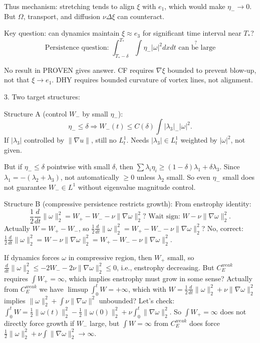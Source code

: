 \documentclass[11pt]{article}
\begin{document}
Thus mechanism: stretching tends to align $\xi$ with $e_1$, which would make $\eta_-\to0$. But $\Omega$, transport, and diffusion $\nu\Delta\xi$ can counteract.

Key question: can dynamics maintain $\xi\approx e_3$ for significant time interval near $T_*$?
\begin{equation*}
\boxed{\text{Persistence question: } \int_{T_*-\delta}^{T_*}\int \eta_-|\omega|^2 dx dt \stackrel{?}{\text{ can be large}}}
\end{equation*}

No result in PROVEN gives answer. CF requires $\nabla\xi$ bounded to prevent blow-up, not that $\xi\to e_1$. DHY requires bounded curvature of vortex lines, not alignment.

3. Two target structures:

Structure A (control $W_-$ by small $\eta_-$):
\begin{equation*}
\boxed{\eta_-\le\delta \Rightarrow W_-(t)\le C(\delta)\int |\lambda_3|_-|\omega|^2}.
\end{equation*}
If $|\lambda_3|$ controlled by $\|\nabla u\|$, still no $L^1_t$. Needs $|\lambda_3|\in L^1_t$ weighted by $|\omega|^2$, not given.

But if $\eta_-\le\delta$ pointwise with small $\delta$, then $\sum\lambda_i\eta_i\ge (1-\delta)\lambda_1+\delta\lambda_3$. Since $\lambda_1=-(\lambda_2+\lambda_3)$, not automatically $\ge0$ unless $\lambda_2$ small. So even $\eta_-$ small does not guarantee $W_-\in L^1$ without eigenvalue magnitude control.

Structure B (compressive persistence restricts growth):
From enstrophy identity:
\begin{equation*}
\frac12\frac{d}{dt}\|\omega\|_2^2 = W_+ - W_- -\nu\|\nabla\omega\|_2^2\text{? Wait sign: }W -\nu\|\nabla\omega\|_2^2.
\end{equation*}
Actually $W=W_+-W_-$, so $\frac12\frac{d}{dt}\|\omega\|_2^2 = W_+-W_- -\nu\|\nabla\omega\|_2^2$? No, correct: $\frac12\frac{d}{dt}\|\omega\|_2^2 = W -\nu\|\nabla\omega\|_2^2 = W_+-W_--\nu\|\nabla\omega\|_2^2$.

If dynamics forces $\omega$ in compressive region, then $W_+$ small, so $\frac{d}{dt}\|\omega\|_2^2\le -2W_- -2\nu\|\nabla\omega\|_2^2\le0$, i.e., enstrophy decreasing. But $C_E^{weak}$ requires $\int W_+=\infty$, which implies enstrophy must grow in some sense? Actually from $C_E^{weak}$ we have $\limsup\int_0^t W=+\infty$, which with $W= \frac12\frac{d}{dt}\|\omega\|_2^2+\nu\|\nabla\omega\|_2^2$ implies $\|\omega\|_2^2+\int\nu\|\nabla\omega\|^2$ unbounded? Let's check: $\int_0^t W = \frac12\|\omega(t)\|_2^2-\frac12\|\omega(0)\|_2^2+\nu\int_0^t\|\nabla\omega\|_2^2$. So $\int W_+=\infty$ does not directly force growth if $W_-$ large, but $\int W =\infty$ from $C_E^{weak}$ does force $\frac12\|\omega\|_2^2+\nu\int\|\nabla\omega\|_2^2\to\infty$.
\end{document}
